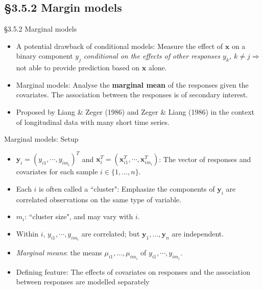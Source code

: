 \documentclass{beamer}
\newcommand{\currentsubsection}{}
\let\oldsubsection\subsection
\renewcommand{\subsection}[1]{\oldsubsection{#1}\renewcommand{\currentsubsection}{#1}}
\newenvironment{wideitemize}%
  {\begin{itemize}%
    \setlength{\parskip}{1em}}%
  {\end{itemize}}
\begin{document}
\subsection{\S3.5.2 Margin models} \label{sec:3.5.2}
\begin{frame}{\S3.5.2 Marginal models}
\begin{wideitemize}
\item 
A potential drawback of conditional models: Measure the effect of $\textbf{x}$ on a binary component $y_j$ \emph{conditional on 
the effects of other responses $y_k$, $k\neq j$}$\Rightarrow$ not able to provide prediction based on $\textbf{x}$ alone.

\item
Marginal models: Analyse the \textbf{marginal mean} of the responses given
the covariates. The association between the responses is of secondary interest. 
\item
Proposed by Liang \& Zeger (1986)  and Zeger \& Liang (1986) in the context
of longitudinal data with many short time series.  
%
\end{wideitemize}
\end{frame}

\begin{frame}{\large Marginal models: Setup}
\begin{wideitemize}

\item $\textbf{y}_i=(y_{i1},\cdots, y_{im_i})^T$ and $\textbf{x}_i^T=(\textbf{x}_{i1}^T, \cdots, \textbf{x}_{im_i}^T)$: The vector of responses and covariates for each sample $i \in \{1,\dots, n\}$.

\item Each $i$ is often  called a ``cluster": Emphasize the components of $\textbf{y}_i$ are correlated observations on the same type of variable.


\item $m_i$: ``cluster size",  and may vary with $i$.
\item
Within $i$, $y_{i1},\cdots, y_{im_i}$ are correlated; but $\textbf{y}_1, \dots, \textbf{y}_n$ are independent.


\item \emph{Marginal means}: the means $\mu_{ i1}, \dots, \mu_{i m_i}$ of $y_{i1},\cdots, y_{im_i}$.
\item Defining feature: The effects of covariates on responses and the association between responses are modelled separately

\end{wideitemize}
\end{frame}
\end{document}
